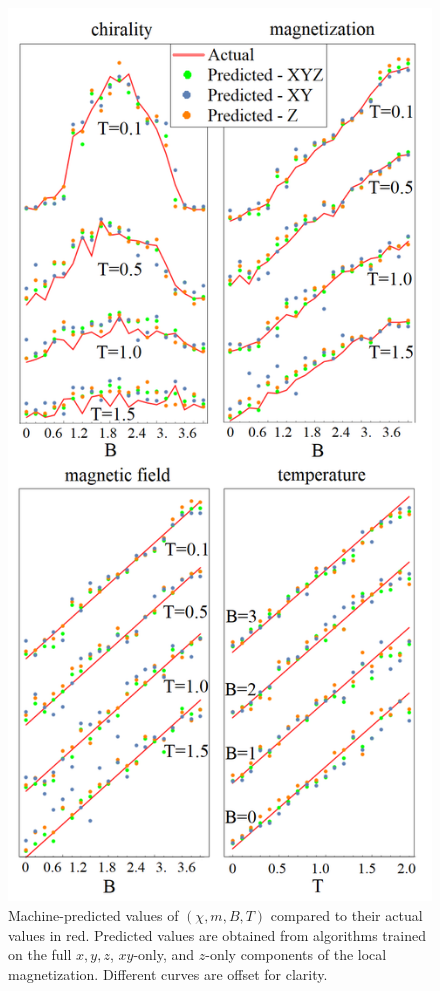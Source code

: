 \documentclass[reprint,amsmath,amssymb,aps,showpacs,superscriptaddress,prl]{revtex4-1}
\begin{document}
\begin{figure}[h]
\includegraphics[scale=0.35]{fig3.png}
\caption{Machine-predicted values of $(\chi, m, B, T)$ compared to their actual values in red. Predicted values are obtained from algorithms trained on the full $x,y,z$, $xy$-only, and $z$-only components of the local magnetization. Different curves are offset for clarity.}\label{fig:3}
\end{figure}
\end{document}
